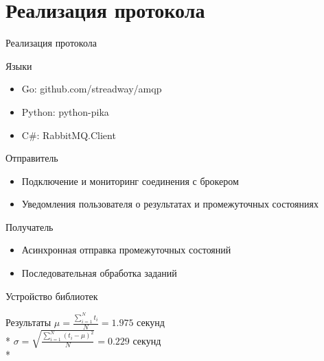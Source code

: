 \documentclass[xetex,mathserif,serif,10pt]{beamer}
\newenvironment{sframe}[2]{\section{#1}\begin{frame}[label=#2]{#1}}{\end{frame}}
\begin{document}
    \begin{sframe}{Реализация протокола}{binddev}
        \begin{block}{Языки}
            \begin{itemize}
                \item Go: github.com/streadway/amqp
                \item Python: python-pika
                \item C\#: RabbitMQ.Client
            \end{itemize}
        \end{block}
        \begin{block}{Отправитель}
            \begin{itemize}
                \item Подключение и мониторинг соединения с брокером
                \item Уведомления пользователя о результатах и промежуточных
                    состояниях
            \end{itemize}
        \end{block}
        \begin{block}{Получатель}
            \begin{itemize}
                \item Асинхронная отправка промежуточных состояний
                \item Последовательная обработка заданий
            \end{itemize}
        \end{block}
    \end{sframe}

    \begin{frame}{Устройство библиотек}
        \begin{figure}
            \centering
        \end{figure}
    \end{frame}

    \begin{frame}{Результаты}
        $\mu = \frac{\sum_{i=1}^N t_i}{N} = 1.975$ секунд \\*
        $\sigma = \sqrt{\frac{\sum_{i=1}^N \left(t_i - \mu\right)^2}{N}} =
        0.229$ секунд \\*
        \begin{figure}
            \centering
        \end{figure}
    \end{frame}
\end{document}
